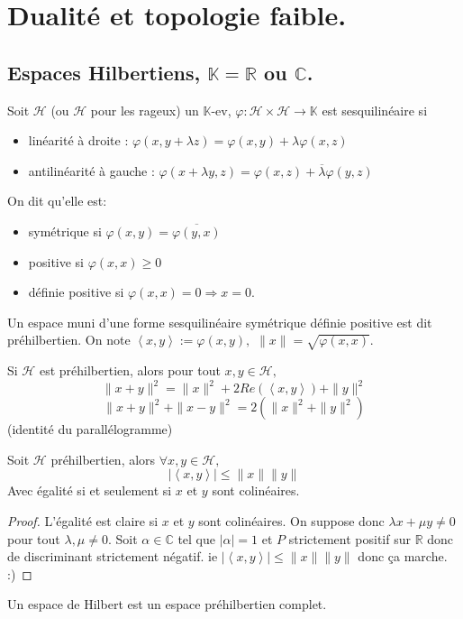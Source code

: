 \section{Dualité et topologie faible.}
\subsection{Espaces Hilbertiens, \texorpdfstring{$\mathbb{K}=\mathbb{R} $ ou $\mathbb{C}$.}{Lg} }
\begin{definition}
    Soit $\mathcal{H}$ (ou $\mathscr {H}$ pour les rageux) un $\mathbb{K}$-ev, $\varphi :\mathcal{H}\times \mathcal{H}\to \mathbb{K}$ est sesquilinéaire si
    \begin{itemize}
        \item linéarité à droite : $\varphi (x,y+\lambda z)=\varphi (x,y)+\lambda \varphi (x,z)$
    \item antilinéarité à gauche : $\varphi (x+\lambda y,z)=\varphi (x,z)+\overline{\lambda}\varphi (y,z)$
    \end{itemize}

    On dit qu'elle est:
    \begin{itemize}
        \item symétrique si $\varphi (x,y)=\overline{\varphi (y,x)}$
        \item positive si $\varphi (x,x)\ge 0$
        \item définie positive si $\varphi (x,x)=0\Rightarrow x=0$.
    \end{itemize}
\end{definition}

Un espace muni d'une forme sesquilinéaire symétrique définie positive est dit préhilbertien. On note $\left<x,y \right> := \varphi (x,y),$ $\|x\|=\sqrt{\varphi (x,x)} $.

\begin{remarque}
    Si $\mathcal{H}$ est préhilbertien, alors pour tout $x,y\in \mathcal{H},$ $$\|x+y\|^2=\|x\|^2+2Re\left( \left<x,y \right> \right) +\|y\|^2$$
    $$\|x+y\|^2+\|x-y\|^2=2\left( \|x\|^2+\|y\|^2 \right) $$
    (identité du parallélogramme)
\end{remarque}
\begin{propriete}
    Soit $\mathcal{H}$ préhilbertien, alors $\forall x,y\in \mathcal{H},$\\
    $$|\left<x,y \right>| \le \|x\|\|y\| $$
    Avec égalité si et seulement si $x$ et $y$ sont colinéaires.
\end{propriete}
\begin{proof}
    L'égalité est claire si $x$ et $y$ sont colinéaires. On suppose donc $\lambda x+\mu y\neq 0$ pour tout $\lambda,\mu\neq 0$. 
    Soit $\alpha \in \mathbb{C}$ tel que $| \alpha |=1$ et $P$ strictement positif sur $\mathbb{R} $ donc de discriminant strictement négatif. ie $|\left<x,y \right>| \le \|x\|\|y\|$ donc ça marche. :)
\end{proof}
\begin{remarque}
Un espace de Hilbert est un espace préhilbertien complet.
\end{remarque}

